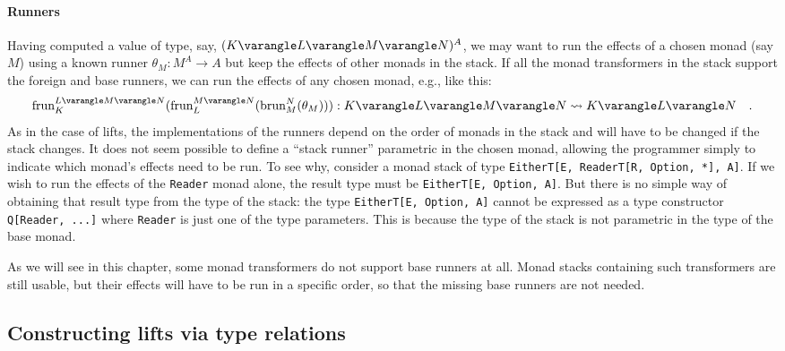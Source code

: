 \paragraph{Runners}

Having computed a value of type, say, $(K\varangle L\varangle M\varangle N)^{A}$,
we may want to run the effects of a chosen monad (say $M$) using
a known runner $\theta_{M}:M^{A}\rightarrow A$ but keep the effects
of other monads in the stack. If all the monad transformers in the
stack support the foreign and base runners, we can run the effects
of any chosen monad, e.g., like this:
\[
\text{frun}_{K}^{L\varangle M\varangle N}(\text{frun}_{L}^{M\varangle N}(\text{brun}_{M}^{N}(\theta_{M}))):K\varangle L\varangle M\varangle N\leadsto K\varangle L\varangle N\quad.
\]
As in the case of lifts, the implementations of the runners depend
on the order of monads in the stack and will have to be changed if
the stack changes. It does not seem possible to define a \textsf{``}stack
runner\textsf{''} parametric in the chosen monad, allowing the programmer
simply to indicate which monad\textsf{'}s effects need to be run. To see why,
consider a monad stack of type \lstinline!EitherT[E, ReaderT[R, Option, *], A]!.
If we wish to run the effects of the \lstinline!Reader! monad alone,
the result type must be \lstinline!EitherT[E, Option, A]!. But there
is no simple way of obtaining that result type from the type of the
stack: the type \lstinline!EitherT[E, Option, A]! cannot be expressed
as a type constructor \lstinline!Q[Reader, ...]! where \lstinline!Reader!
is just one of the type parameters. This is because the type of the
stack is not parametric in the type of the base monad.

As we will see in this chapter, some monad transformers do not support
base runners at all. Monad stacks containing such transformers are
still usable, but their effects will have to be run in a specific
order, so that the missing base runners are not needed.

\subsection{Constructing lifts via type relations\label{subsec:Constructing-lifts-via-type-relations}}

